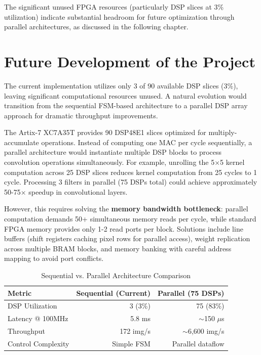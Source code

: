 \documentclass[12pt,a4paper]{report}
\begin{document}
The significant unused FPGA resources (particularly DSP slices at 3\% utilization) indicate substantial headroom for future optimization through parallel architectures, as discussed in the following chapter.

\chapter{Future Development of the Project}

The current implementation utilizes only 3 of 90 available DSP slices (3\%), leaving significant computational resources unused. A natural evolution would transition from the sequential FSM-based architecture to a parallel DSP array approach for dramatic throughput improvements.

The Artix-7 XC7A35T provides 90 DSP48E1 slices optimized for multiply-accumulate operations. Instead of computing one MAC per cycle sequentially, a parallel architecture would instantiate multiple DSP blocks to process convolution operations simultaneously. For example, unrolling the 5$\times$5 kernel computation across 25 DSP slices reduces kernel computation from 25 cycles to 1 cycle. Processing 3 filters in parallel (75 DSPs total) could achieve approximately 50-75$\times$ speedup in convolutional layers.

However, this requires solving the \textbf{memory bandwidth bottleneck}: parallel computation demands 50+ simultaneous memory reads per cycle, while standard FPGA memory provides only 1-2 read ports per block. Solutions include line buffers (shift registers caching pixel rows for parallel access), weight replication across multiple BRAM blocks, and memory banking with careful address mapping to avoid port conflicts.

\begin{table}[H]
\centering
\caption{Sequential vs. Parallel Architecture Comparison}
\label{tab:seq_vs_parallel}
\begin{tabular}{lrr}
\toprule
\textbf{Metric} & \textbf{Sequential (Current)} & \textbf{Parallel (75 DSPs)} \\
\midrule
DSP Utilization & 3 (3\%) & 75 (83\%) \\
Latency @ 100MHz & 5.8 ms & $\sim$150 $\mu$s \\
Throughput & 172 img/s & $\sim$6,600 img/s \\
Control Complexity & Simple FSM & Parallel dataflow \\
\bottomrule
\end{tabular}
\end{table}
\end{document}
